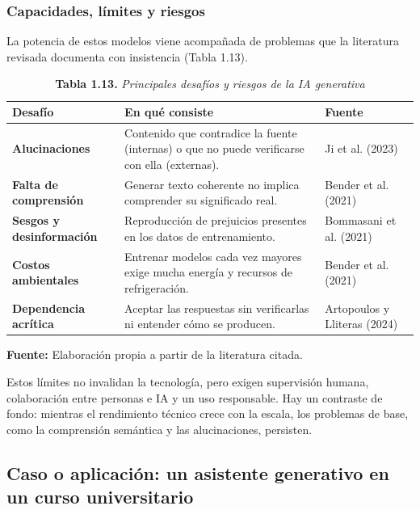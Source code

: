\subsubsection{Capacidades, límites y riesgos}
La potencia de estos modelos viene acompañada de problemas que la literatura revisada documenta con insistencia (Tabla 1.13).

\begin{table}[htpb!]
\centering
\small\sffamily
\caption{\textbf{Tabla 1.13.} \textit{Principales desafíos y riesgos de la IA generativa}}
\vspace{0.15cm}
\begin{tabularx}{\textwidth}{>{\bfseries}p{3.5cm} >{\raggedright\arraybackslash}p{7.5cm} >{\raggedright\arraybackslash}X}
\toprule
Desafío & En qué consiste & Fuente \\
\midrule
Alucinaciones & Contenido que contradice la fuente (internas) o que no puede verificarse con ella (externas). & Ji et al. (2023) \\
\midrule
Falta de comprensión & Generar texto coherente no implica comprender su significado real. & Bender et al. (2021) \\
\midrule
Sesgos y desinformación & Reproducción de prejuicios presentes en los datos de entrenamiento. & Bommasani et al. (2021) \\
\midrule
Costos ambientales & Entrenar modelos cada vez mayores exige mucha energía y recursos de refrigeración. & Bender et al. (2021) \\
\midrule
Dependencia acrítica & Aceptar las respuestas sin verificarlas ni entender cómo se producen. & Artopoulos y Lliteras (2024) \\
\bottomrule
\end{tabularx}
\vspace{0.15cm}
\raggedright\scriptsize \textbf{Fuente:} Elaboración propia a partir de la literatura citada.
\end{table}

Estos límites no invalidan la tecnología, pero exigen supervisión humana, colaboración entre personas e IA y un uso responsable. Hay un contraste de fondo: mientras el rendimiento técnico crece con la escala, los problemas de base, como la comprensión semántica y las alucinaciones, persisten.

\vspace{0.3cm}

\subsection{Caso o aplicación: un asistente generativo en un curso universitario}

